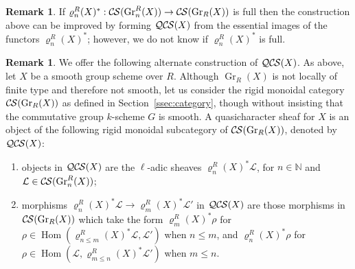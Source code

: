 \documentclass[10pt]{amsart}
\theoremstyle{plain}
\theoremstyle{definition}
\newtheorem{remark}[theorem]{Remark}
\newcommand{\NN}{{\mathbb{N}}}
\newcommand{\Fq}{k}
\DeclareMathOperator{\Hom}{Hom}
\DeclareMathOperator{\Gr}{Gr}
\newcommand{\cs}[1]{{\mathcal{#1}}}
\newcommand{\CS}{{\mathcal{C\hskip-0.8pt S}}}
\newcommand{\QCS}{{\mathcal{QC\hskip-0.8pt S}}}
\begin{document}
\begin{remark}
If $\varrho^R_n(X)^* : \CS(\Gr^R_n(X)) \to \CS(\Gr_R(X))$ is full then the construction above can be improved
by forming $\QCS(X)$ from the essential images of the functors $\varrho^R_n(X)^*$; however, we do not know if $\varrho^R_n(X)^*$ is full.
\end{remark}

\begin{remark}
We offer the following alternate construction of $\QCS(X)$.
As above, let $X$ be a smooth group scheme over $R$.
Although $\Gr_R(X)$ is not locally of finite type and therefore not smooth,
let us consider the rigid monoidal category $\CS(\Gr_R(X))$ as defined in Section~\ref{ssec:category},
though without insisting that the commutative group $\Fq$-scheme $G$ is smooth.
A quasicharacter sheaf for $X$ is an object of
the following rigid monoidal subcategory of $\CS(\Gr_R(X))$, denoted by $\QCS(X)$:
\begin{enumerate}
\item
objects in $\QCS(X)$ are the $\ell$-adic sheaves $\varrho^R_n(X)^*\cs{L}$, for $n\in \NN$ and $\cs{L} \in \CS(\Gr^R_n(X))$; 
\item
morphisms $\varrho^R_n(X)^*\cs{L} \to \varrho^R_m(X)^*\cs{L}'$ in $\QCS(X)$ are those morphisms
in $\CS(\Gr_R(X))$ which take the form $\varrho^R_m(X)^*\rho$ for $\rho \in \Hom(\varrho^R_{n\leq m}(X)^*\cs{L},\cs{L}')$
when $n\leq m$, and $\varrho^R_n(X)^*\rho$ for $\rho \in \Hom(\cs{L},\varrho^R_{m\leq n}(X)^*\cs{L}')$ when $m\leq n$.
\end{enumerate}
\end{remark}
\end{document}
